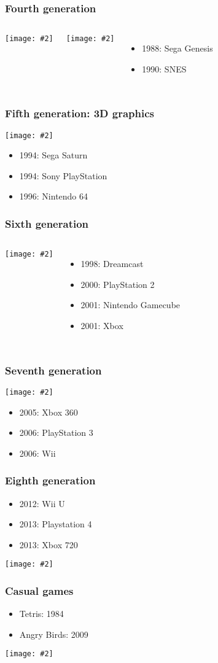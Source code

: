 \documentclass{beamer}
\newcommand{\bi}{\begin{itemize}}
\newcommand{\ei}{\end{itemize}}
\newcommand{\grf}[2]{\texttt{[image: \#2]}}
\newcommand{\tw}{\textwidth}
\newcommand{\bc}{\begin{columns}}
\newcommand{\ec}{\end{columns}}
\newcommand{\cc}[1]{\column{#1\textwidth}}
\begin{document}
\begin{frame}\frametitle{Fourth generation}
\bc
\cc{0.6}
\grf{0.8\tw}{sonic.png}

\hfill\grf{0.8\tw}{marioyoshi.png}
\cc{0.4}
\bi
\item 1988: Sega Genesis
\item 1990: SNES
\ei
\ec
\end{frame}

\begin{frame}\frametitle{Fifth generation: 3D graphics}
\grf{0.9\tw}{legendofzeldaocarinaoftime.png}

\bi
\item 1994: Sega Saturn
\item 1994: Sony PlayStation
\item 1996: Nintendo 64
\ei

\end{frame}

\begin{frame}\frametitle{Sixth generation}
\bc
\cc{0.7}
\grf{\tw}{grandtheftauto.png}
\cc{0.3}
\bi
\item 1998: Dreamcast
\item 2000: PlayStation 2
\item 2001: Nintendo Gamecube
\item 2001: Xbox
\ei
\ec
\end{frame}

\begin{frame}\frametitle{Seventh generation}

\grf{\tw}{wiisports.png}

\bi
\item 2005: Xbox 360
\item 2006: PlayStation 3
\item 2006: Wii
  \ei

 \end{frame}
\begin{frame}\frametitle{Eighth generation}
\bi
\item 2012: Wii U
\item 2013: Playstation 4
\item 2013: Xbox 720
\ei
\grf{\tw}{wii-u-controller.png}

\end{frame}
\begin{frame}\frametitle{Casual games}
\bi
\item Tetris: 1984
\item Angry Birds: 2009
\ei
\grf{\tw}{angrybirds.jpg}
\end{frame}
\end{document}
